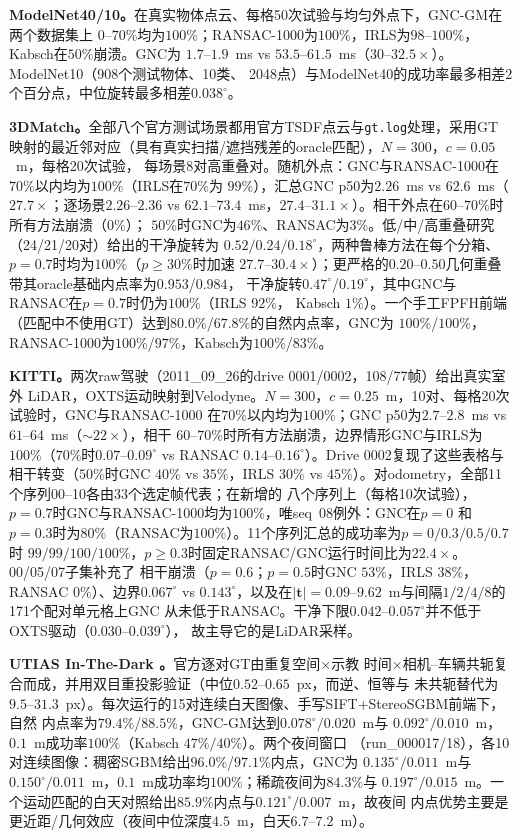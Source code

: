 \noindent\textbf{ModelNet40/10。}在真实物体点云、每格50次试验与均匀外点下，GNC-GM在两个数据集上
$0$--$70\%$均为$100\%$；RANSAC-1000为$100\%$，IRLS为$98$--$100\%$，Kabsch在$50\%$崩溃。GNC为
$1.7$--$1.9$~ms vs $53.5$--$61.5$~ms（$30$--$32.5\times$）。ModelNet10（908个测试物体、10类、
2048点）与ModelNet40的成功率最多相差$2$个百分点，中位旋转最多相差$0.038^\circ$。

\noindent\textbf{3DMatch。}全部八个官方测试场景都用官方TSDF点云与\texttt{gt.log}处理，采用GT
映射的最近邻对应（具有真实扫描/遮挡残差的oracle匹配），$N=300$，$c=0.05$~m，每格20次试验，
每场景8对高重叠对。随机外点：GNC与RANSAC-1000在$70\%$以内均为$100\%$（IRLS在$70\%$为
$99\%$），汇总GNC p50为$2.26$~ms vs $62.6$~ms（$27.7\times$；逐场景$2.26$--$2.36$ vs
$62.1$--$73.4$~ms，$27.4$--$31.1\times$）。相干外点在$60$--$70\%$时所有方法崩溃（$0\%$）；
$50\%$时GNC为$46\%$、RANSAC为$3\%$。低/中/高重叠研究（24/21/20对）给出的干净旋转为
$0.52/0.24/0.18^\circ$，两种鲁棒方法在每个分箱、$p=0.7$时均为$100\%$（$p\ge30\%$时加速
$27.7$--$30.4\times$）；更严格的$0.20$--$0.50$几何重叠带其oracle基础内点率为$0.953$/$0.984$，
干净旋转$0.47^\circ$/$0.19^\circ$，其中GNC与RANSAC在$p=0.7$时仍为$100\%$（IRLS $92\%$，
Kabsch $1\%$）。一个手工FPFH前端（匹配中不使用GT）达到$80.0\%$/$67.8\%$的自然内点率，GNC为
$100\%$/$100\%$，RANSAC-1000为$100\%$/$97\%$，Kabsch为$100\%$/$83\%$。

\noindent\textbf{KITTI。}两次raw驾驶（2011\_09\_26的drive 0001/0002，108/77帧）给出真实室外
LiDAR，OXTS运动映射到Velodyne。$N=300$，$c=0.25$~m，10对、每格20次试验时，GNC与RANSAC-1000
在$70\%$以内均为$100\%$；GNC p50为$2.7$--$2.8$~ms vs $61$--$64$~ms（$\sim22\times$），相干
$60$--$70\%$时所有方法崩溃，边界情形GNC与IRLS为$100\%$（$70\%$时$0.07$--$0.09^\circ$ vs
RANSAC $0.14$--$0.16^\circ$）。Drive 0002复现了这些表格与相干转变（$50\%$时GNC $40\%$ vs
$35\%$，IRLS $30\%$ vs $45\%$）。对odometry，全部11个序列00--10各由33个选定帧代表；在新增的
八个序列上（每格10次试验），$p=0.7$时GNC与RANSAC-1000均为$100\%$，唯seq~08例外：GNC在$p=0$
和$p=0.3$时为$80\%$（RANSAC为$100\%$）。11个序列汇总的成功率为$p=0/0.3/0.5/0.7$时
$99/99/100/100\%$，$p\ge0.3$时固定RANSAC/GNC运行时间比为$22.4\times$。00/05/07子集补充了
相干崩溃（$p=0.6$；$p=0.5$时GNC $53\%$，IRLS $38\%$，RANSAC $0\%$）、边界$0.067^\circ$ vs
$0.143^\circ$，以及在$|\mathbf{t}|=0.09$--$9.62$~m与间隔$1/2/4/8$的171个配对单元格上GNC
从未低于RANSAC。干净下限$0.042$--$0.057^\circ$并不低于OXTS驱动（$0.030$--$0.039^\circ$），
故主导它的是LiDAR采样。

\noindent\textbf{UTIAS In-The-Dark \cite{utias2020inthedark}。}官方逐对GT由重复空间$\times$示教
时间$\times$相机--车辆共轭复合而成，并用双目重投影验证（中位$0.52$--$0.65$~px，而逆、恒等与
未共轭替代为$9.5$--$31.3$~px）。每次运行的15对连续白天图像、手写SIFT+StereoSGBM前端下，自然
内点率为$79.4\%$/$88.5\%$，GNC-GM达到$\mathbf{0.078^\circ/0.020}$~m与
$\mathbf{0.092^\circ/0.010}$~m，$0.1$~m成功率$100\%$（Kabsch $47\%/40\%$）。两个夜间窗口
（run\_000017/18），各10对连续图像：稠密SGBM给出$96.0\%$/$97.1\%$内点，GNC为
$0.135^\circ/0.011$~m与$0.150^\circ/0.011$~m，$0.1$~m成功率均$100\%$；稀疏夜间为$84.3\%$与
$0.197^\circ/0.015$~m。一个运动匹配的白天对照给出$85.9\%$内点与$0.121^\circ/0.007$~m，故夜间
内点优势主要是更近距/几何效应（夜间中位深度$4.5$~m，白天$6.7$--$7.2$~m）。

